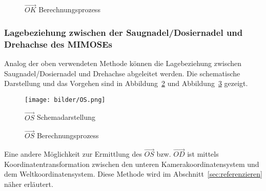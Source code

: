 \begin{figure}[H]
\begin{center} 
\caption{$\vec{OK}$ Berechnungsprozess}
\label{fig:Passermarker}
\end{center}
\end{figure}

\subsubsection{Lagebeziehung zwischen der Saugnadel/Dosiernadel und Drehachse des MIMOSEs}
Analog der oben verwendeten Methode können die Lagebeziehung zwischen Saugnadel/Dosiernadel und Drehachse abgeleitet werden. Die schematische Darstellung und das Vorgehen sind in Abbildung~\ref{fig:OS} und Abbildung~\ref{fig:OS0180} gezeigt. 

\begin{figure}[H]
    \centering
    \texttt{[image: bilder/OS.png]}
    \caption{$\vec{OS}$ Schemadarstellung}
    \label{fig:OS}
\end{figure}
\begin{figure}[H]
\begin{center}
\caption{$\vec{OS} $ Berechnungsprozess}
\label{fig:OS0180}
\end{center}
\end{figure}
Eine andere Möglichkeit zur Ermittlung des $\vec{OS}$ bzw. $\vec{OD}$ ist mittels Koordinatentransformation zwischen den unteren Kamerakoordinatensystem und dem Weltkoordinatensystem. Diese Methode wird im Abschnitt~\ref{sec:referenzieren} näher erläutert.

